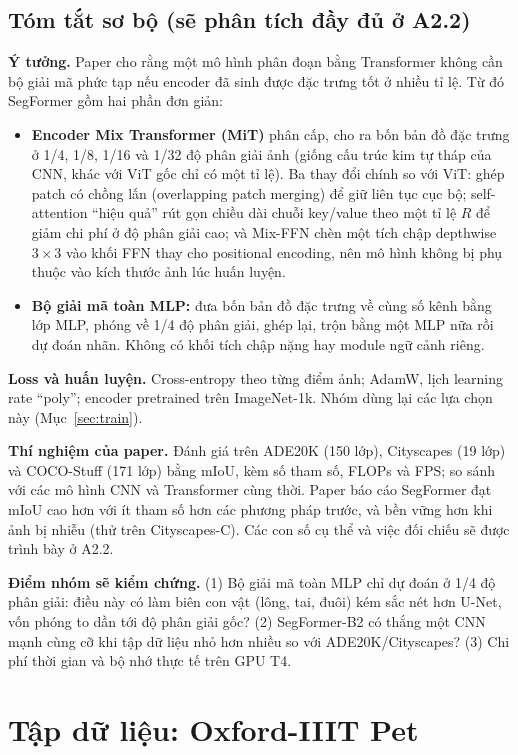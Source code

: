 \documentclass[12pt]{article}
\newcommand{\st}[1]{\textbf{#1}}
\begin{document}
\subsection{Tóm tắt sơ bộ (sẽ phân tích đầy đủ ở A2.2)}
\textbf{Ý tưởng.} Paper cho rằng một mô hình phân đoạn bằng Transformer không cần bộ giải mã phức tạp nếu encoder đã sinh
được đặc trưng tốt ở nhiều tỉ lệ. Từ đó SegFormer gồm hai phần đơn giản:
\begin{itemize}
  \item \st{Encoder Mix Transformer (MiT)} phân cấp, cho ra bốn bản đồ đặc trưng ở 1/4, 1/8, 1/16 và 1/32 độ phân giải ảnh
        (giống cấu trúc kim tự tháp của CNN, khác với ViT gốc chỉ có một tỉ lệ). Ba thay đổi chính so với ViT:
        ghép patch có chồng lấn (overlapping patch merging) để giữ liên tục cục bộ; self-attention ``hiệu quả'' rút
        gọn chiều dài chuỗi key/value theo một tỉ lệ $R$ để giảm chi phí ở độ phân giải cao; và Mix-FFN chèn một tích chập
        depthwise $3\times3$ vào khối FFN thay cho positional encoding, nên mô hình không bị phụ thuộc vào kích thước ảnh
        lúc huấn luyện.
  \item \st{Bộ giải mã toàn MLP:} đưa bốn bản đồ đặc trưng về cùng số kênh bằng lớp MLP, phóng về 1/4 độ phân giải,
        ghép lại, trộn bằng một MLP nữa rồi dự đoán nhãn. Không có khối tích chập nặng hay module ngữ cảnh riêng.
\end{itemize}
\textbf{Loss và huấn luyện.} Cross-entropy theo từng điểm ảnh; AdamW, lịch learning rate ``poly''; encoder pretrained trên
ImageNet-1k. Nhóm dùng lại các lựa chọn này (Mục~\ref{sec:train}).

\textbf{Thí nghiệm của paper.} Đánh giá trên ADE20K (150 lớp), Cityscapes (19 lớp) và COCO-Stuff (171 lớp) bằng mIoU,
kèm số tham số, FLOPs và FPS; so sánh với các mô hình CNN và Transformer cùng thời. Paper báo cáo SegFormer đạt mIoU
cao hơn với ít tham số hơn các phương pháp trước, và bền vững hơn khi ảnh bị nhiễu (thử trên Cityscapes-C). Các con số cụ
thể và việc đối chiếu sẽ được trình bày ở A2.2.

\textbf{Điểm nhóm sẽ kiểm chứng.} (1) Bộ giải mã toàn MLP chỉ dự đoán ở 1/4 độ phân giải: điều này có làm biên con vật
(lông, tai, đuôi) kém sắc nét hơn U-Net, vốn phóng to dần tới độ phân giải gốc? (2) SegFormer-B2 có thắng một CNN mạnh
cùng cỡ khi tập dữ liệu nhỏ hơn nhiều so với ADE20K/Cityscapes? (3) Chi phí thời gian và bộ nhớ thực tế trên GPU T4.

\section{Tập dữ liệu: Oxford-IIIT Pet}
\end{document}

